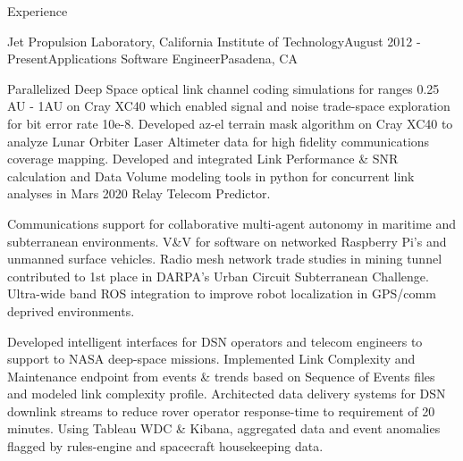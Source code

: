 \documentclass{resume} %
\begin{document}





\begin{rSection}{Experience}
\begin{rSubsection}{Jet Propulsion Laboratory, California Institute of Technology}{August 2012 - Present}{Applications Software Engineer}{Pasadena, CA}

\item Parallelized Deep Space optical link channel coding simulations for ranges 0.25 AU - 1AU on Cray XC40 which enabled signal and noise trade-space exploration for bit error rate 10e-8. Developed az-el terrain mask algorithm on Cray XC40 to analyze Lunar Orbiter Laser Altimeter data for high fidelity communications coverage mapping. Developed and integrated Link Performance \& SNR calculation and Data Volume modeling tools in python for concurrent link analyses in Mars 2020 Relay Telecom Predictor. 


\item Communications support for collaborative multi-agent autonomy in maritime and subterranean environments. V\&V for  software on networked Raspberry Pi's and unmanned surface vehicles.  Radio mesh network trade studies in mining tunnel contributed to 1st place in DARPA's  Urban Circuit Subterranean Challenge. Ultra-wide band ROS integration to improve robot localization in GPS/comm deprived environments.

\item Developed intelligent interfaces for DSN operators and telecom engineers to support to NASA deep-space missions. Implemented Link Complexity and Maintenance endpoint from events \& trends based on Sequence of Events files and modeled link complexity profile. Architected data delivery systems for DSN downlink streams to reduce rover operator response-time to requirement of 20 minutes. Using Tableau WDC \& Kibana, aggregated data and event anomalies flagged by rules-engine and spacecraft housekeeping data. 


\end{rSubsection}
\end{rSection}
\end{document}
